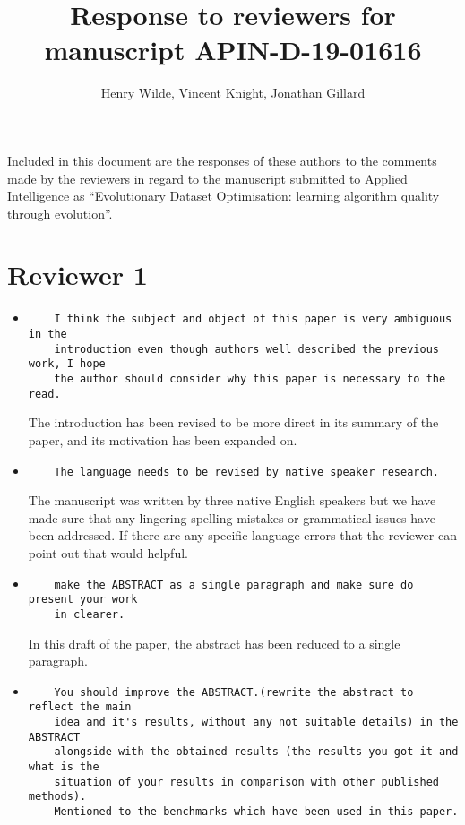\documentclass[11pt]{article}
\title{Response to reviewers for manuscript APIN-D-19-01616}
\author{Henry Wilde, Vincent Knight, Jonathan Gillard}
\date{}
\begin{document}
\maketitle%

Included in this document are the responses of these authors to the comments
made by the reviewers in regard to the manuscript submitted to Applied
Intelligence as ``Evolutionary Dataset Optimisation: learning algorithm quality
through evolution''.

\section*{Reviewer 1}

\begin{itemize}

\item
\begin{verbatim}
    I think the subject and object of this paper is very ambiguous in the
    introduction even though authors well described the previous work, I hope
    the author should consider why this paper is necessary to the read.
\end{verbatim}

The introduction has been revised to be more direct in its summary of the paper,
and its motivation has been expanded on.


\item
\begin{verbatim}
    The language needs to be revised by native speaker research.
\end{verbatim}

The manuscript was written by three native English speakers but we have made
sure that any lingering spelling mistakes or grammatical issues have been
addressed. If there are any specific language errors that the reviewer can point
out that would helpful.

\item
\begin{verbatim}
    make the ABSTRACT as a single paragraph and make sure do present your work
    in clearer.
\end{verbatim}

In this draft of the paper, the abstract has been reduced to a single paragraph.

\item
\begin{verbatim}
    You should improve the ABSTRACT.(rewrite the abstract to reflect the main
    idea and it's results, without any not suitable details) in the ABSTRACT
    alongside with the obtained results (the results you got it and what is the
    situation of your results in comparison with other published methods).
    Mentioned to the benchmarks which have been used in this paper.
\end{verbatim}


\end{itemize}
\end{document}
